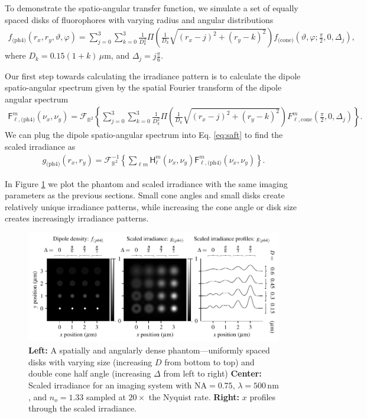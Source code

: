 \documentclass[]{osa-article}
\providecommand{\mc}[1]{\mathcal{#1}}
\providecommand{\mbb}[1]{\mathbb{#1}}
\begin{document}
 To demonstrate the spatio-angular transfer function, we simulate a set of
 equally spaced disks of fluorophores with varying radius and angular
 distributions
 \begin{align}
   f_{\text{(ph4)}}(r_x, r_y, \vartheta, \varphi) = \sum_{j=0}^3 \sum_{k=0}^3 \frac{1}{D_k^2}\Pi\left(\frac{1}{D_k}\sqrt{\left(r_x - j\right)^2 + \left(r_y - k\right)^2}\right)f_{\text{(cone)}}\left(\vartheta, \varphi; \frac{\pi}{2}, 0, \Delta_j\right),\label{eq:phantom4}
 \end{align}
 where $D_k = 0.15(1+k)\, \mu$m, and $\Delta_j = j\frac{\pi}{6}$. 
 
 Our first step towards calculating the irradiance pattern is to calculate the
 dipole spatio-angular spectrum given by the spatial Fourier transform of the dipole angular spectrum  
  \begin{align}
   \mathsf{F}_{\ell,\text{(ph4)}}^m(\nu_x, \nu_y) = \mc{F}_{\mbb{R}^2}\left\{\sum_{j=0}^3 \sum_{k=0}^3 \frac{1}{D_k^2}\Pi\left(\frac{1}{D_k}\sqrt{\left(r_x - j\right)^2 + \left(r_y - k\right)^2}\right)F_{\ell,\text{cone}}^m\left(\frac{\pi}{2}, 0, \Delta_j\right)\right\}.
  \end{align}
  We can plug the dipole spatio-angular spectrum into Eq. \ref{eq:saft} to find
  the scaled irradiance as 
  \begin{align}
   g_{\text{(ph4)}}(r_x, r_y) = \mc{F}^{-1}_{\mbb{R}^2}\left\{\sum_{\ell m}\mathsf{H}_{\ell}^m(\nu_x, \nu_y)\mathsf{F}_{\ell,\text{(ph4)}}^m(\nu_x, \nu_y)\right\}.
  \end{align}

  In Figure \ref{fig:ph4} we plot the phantom and scaled irradiance with the
  same imaging parameters as the previous sections. Small cone angles and small
  disks create relatively unique irradiance patterns, while increasing the cone
  angle or disk size creates increasingly irradiance patterns. 
  
  \begin{figure}[h]
 \centering
   \centering
   \includegraphics[scale=0.8]{../figures/paratfs/ph4.pdf}
   \caption{\textbf{Left:} A spatially and angularly dense phantom---uniformly
     spaced disks with varying size (increasing $D$ from bottom to top) and
     double cone half angle (increasing $\Delta$ from left to right)
     \textbf{Center:} Scaled irradiance for an imaging system with
     $\text{NA} = 0.75$, $\lambda = 500\,\text{nm}$, and $n_o = 1.33$ sampled at
     $20\times$ the Nyquist rate. \textbf{Right:} $x$ profiles through the
     scaled irradiance.}
   \label{fig:ph4}
 \end{figure}
 
\end{document}
